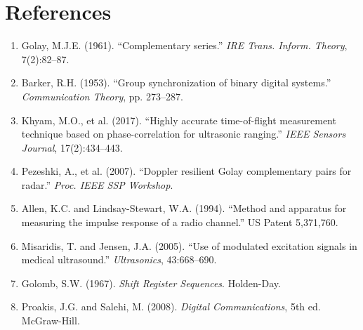 \documentclass[11pt]{article}
\begin{document}
\section{References}

\begin{enumerate}
    \item Golay, M.J.E. (1961). ``Complementary series.'' \textit{IRE Trans. Inform. Theory}, 7(2):82--87.

    \item Barker, R.H. (1953). ``Group synchronization of binary digital systems.'' \textit{Communication Theory}, pp. 273--287.

    \item Khyam, M.O., et al. (2017). ``Highly accurate time-of-flight measurement technique based on phase-correlation for ultrasonic ranging.'' \textit{IEEE Sensors Journal}, 17(2):434--443.

    \item Pezeshki, A., et al. (2007). ``Doppler resilient Golay complementary pairs for radar.'' \textit{Proc. IEEE SSP Workshop}.

    \item Allen, K.C. and Lindsay-Stewart, W.A. (1994). ``Method and apparatus for measuring the impulse response of a radio channel.'' US Patent 5,371,760.

    \item Misaridis, T. and Jensen, J.A. (2005). ``Use of modulated excitation signals in medical ultrasound.'' \textit{Ultrasonics}, 43:668--690.

    \item Golomb, S.W. (1967). \textit{Shift Register Sequences}. Holden-Day.

    \item Proakis, J.G. and Salehi, M. (2008). \textit{Digital Communications}, 5th ed. McGraw-Hill.
\end{enumerate}
\end{document}
